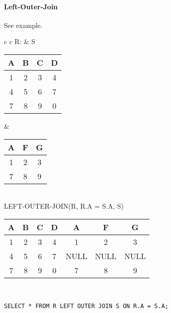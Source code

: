 \paragraph{Left-Outer-Join} See example.\\
\begin{tabular}{ c c}
	R: & S\\
	\begin{tabular}{|c|c|c|c|}
		\hline
		A & B & C & D\\
		\hline
		1 & 2 & 3 & 4\\
		\hline
		4 & 5 & 6 & 7\\
		\hline
		7 & 8 & 9 & 0\\
		\hline
	\end{tabular} &

	\begin{tabular}{|c|c|c|}
		\hline
		A & F & G \\
		\hline
		1 & 2 & 3\\
		\hline
		7 & 8 & 9\\
		\hline
	\end{tabular}
\end{tabular}\\

LEFT-OUTER-JOIN(R, R.A = S.A, S)\\
\begin{tabular}{|c|c|c|c|c|c|c|}
	\hline
	A & B & C & D & A & F & G\\
	\hline
	1 & 2 & 3 & 4 & 1 & 2 & 3\\
	\hline
	4 & 5 & 6 & 7 & NULL & NULL & NULL\\
	\hline
	7 & 8 & 9 & 0 & 7 & 8 & 9\\
	\hline
\end{tabular}\\

\lstset{language=SQL,tabsize=4,captionpos=b,frame=single,
basicstyle=\footnotesize}
\begin{lstlisting}[caption=Left-Outer-Join]
SELECT * FROM R LEFT OUTER JOIN S ON R.A = S.A;
\end{lstlisting}

